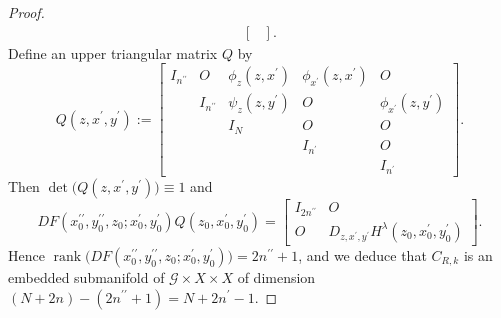 \documentclass[10pt,a4paper]{amsart}
\begin{document}
\begin{proof}
\begin{align*}
\begin{bmatrix}
  \end{bmatrix}. 
\end{align*}
%
%
Define an upper triangular matrix $Q$ by 
%
%
$$
Q(z,x^\prime,y^\prime)
:=
\begin{bmatrix}
I_{n^{\prime\prime}} & O & \phi_z(z,x^\prime) & \phi_{x^\prime}(z,x^\prime) & O 
\\
  & I_{n^{\prime\prime}} & \psi_z(z,y^\prime) & O & \phi_{x^\prime}(z,y^\prime) 
\\
  &                      & I_N                & O            & O
\\
  &                      &                    & I_{n^\prime} & O
\\
  &                      &                    &              & I_{n^\prime}
\end{bmatrix}.
$$
%
%
Then $\operatorname{det}\bigl(Q(z,x^\prime,y^\prime)\bigr)\equiv1$ and 
%
%
$$
DF(x_0^{\prime\prime},y_0^{\prime\prime},z_0;x_0^\prime,y_0^\prime)
Q(z_0,x_0^\prime,y_0^\prime)
=
\begin{bmatrix}
I_{2n^{\prime\prime}} & O
\\
O & D_{z,x^\prime,y^\prime}H^\lambda(z_0,x_0^\prime,y_0^\prime) 
\end{bmatrix}. 
$$
%
%
Hence $\operatorname{rank}\bigl(DF(x_0^{\prime\prime},y_0^{\prime\prime},z_0;x_0^\prime,y_0^\prime)\bigr)=2n^{\prime\prime}+1$, and we deduce that $C_{R,k}$ is an embedded 
submanifold of $\mathcal{G} \times X \times X$ of dimension 
$(N+2n)-(2n^{\prime\prime}+1)=N+2n^\prime-1$. 
\end{proof}
\end{document}
